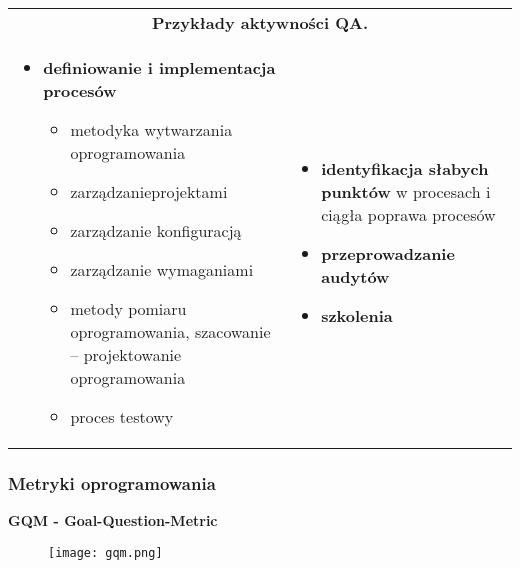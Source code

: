 \documentclass[../main.tex]{subfiles}
\begin{document}
    \begin{table}[H]
        \begin{center}
            \begin{tabular}{p{8cm} p{8cm}}
                \multicolumn{2}{c}{\textbf{Przykłady aktywności QA.}} \\
                \begin{itemize}
                    \item \textbf{definiowanie i implementacja procesów}
                    \begin{itemize}
                        \item metodyka wytwarzania oprogramowania
                        \item zarządzanieprojektami
                        \item zarządzanie konfiguracją
                        \item zarządzanie wymaganiami
                        \item metody pomiaru oprogramowania, szacowanie – projektowanie oprogramowania
                        \item proces testowy
                    \end{itemize}
                \end{itemize}
                &
                \begin{itemize}
                    \item \textbf{identyfikacja słabych punktów} w procesach i ciągła poprawa procesów
                    \item \textbf{przeprowadzanie audytów}
                    \item \textbf{szkolenia}
                \end{itemize}
            \end{tabular}
        \end{center}
    \end{table}

    \subsubsection{Metryki oprogramowania}

    \textbf{GQM - Goal-Question-Metric}

    \begin{figure}[H]
        \texttt{[image: gqm.png]}
    \end{figure}
\end{document}
